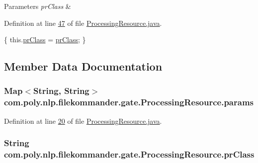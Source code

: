 \begin{DoxyParams}{Parameters}
{\em pr\-Class} & \\
\hline
\end{DoxyParams}


Definition at line \hyperlink{L47}{47} of file \hyperlink{}{Processing\-Resource.\-java}.


\begin{DoxyCode}
                                           \{
        this.\hyperlink{classcom_1_1poly_1_1nlp_1_1filekommander_1_1gate_1_1_processing_resource_a018942d9b39afb00b7d92e874246f191}{prClass} = \hyperlink{classcom_1_1poly_1_1nlp_1_1filekommander_1_1gate_1_1_processing_resource_a018942d9b39afb00b7d92e874246f191}{prClass};
    \}
\end{DoxyCode}


\subsection{Member Data Documentation}
\hypertarget{classcom_1_1poly_1_1nlp_1_1filekommander_1_1gate_1_1_processing_resource_a9d38f54ab731c5b496b0583bd8dcce9b}{
\subsubsection[{params}]{\setlength{\rightskip}{0pt plus 5cm}Map$<$String, String$>$ com.\-poly.\-nlp.\-filekommander.\-gate.\-Processing\-Resource.\-params}}\label{classcom_1_1poly_1_1nlp_1_1filekommander_1_1gate_1_1_processing_resource_a9d38f54ab731c5b496b0583bd8dcce9b}


Definition at line \hyperlink{L20}{20} of file \hyperlink{}{Processing\-Resource.\-java}.

\hypertarget{classcom_1_1poly_1_1nlp_1_1filekommander_1_1gate_1_1_processing_resource_a018942d9b39afb00b7d92e874246f191}{
\subsubsection[{pr\-Class}]{\setlength{\rightskip}{0pt plus 5cm}String com.\-poly.\-nlp.\-filekommander.\-gate.\-Processing\-Resource.\-pr\-Class}}\label{classcom_1_1poly_1_1nlp_1_1filekommander_1_1gate_1_1_processing_resource_a018942d9b39afb00b7d92e874246f191}


